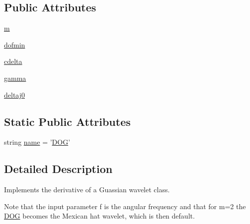 \subsection*{Public Attributes}
\begin{DoxyCompactItemize}
\item 
\hyperlink{classprojects_1_1piwavelet_1_1piwavelet_1_1piwavelet_1_1DOG_ab3b0e7f992bc07e670e7fcd28e2be7ce}{m}
\item 
\hyperlink{classprojects_1_1piwavelet_1_1piwavelet_1_1piwavelet_1_1DOG_ac7d4416da41dd2c65cc37780b350b6aa}{dofmin}
\item 
\hyperlink{classprojects_1_1piwavelet_1_1piwavelet_1_1piwavelet_1_1DOG_aa0750e81cda65734c763621f702e3188}{cdelta}
\item 
\hyperlink{classprojects_1_1piwavelet_1_1piwavelet_1_1piwavelet_1_1DOG_a9ccf6eccd2c0c03b61cb06869472fb35}{gamma}
\item 
\hyperlink{classprojects_1_1piwavelet_1_1piwavelet_1_1piwavelet_1_1DOG_ab3537187ce5b6f2f0fa7fe6a12fe084a}{deltaj0}
\end{DoxyCompactItemize}
\subsection*{Static Public Attributes}
\begin{DoxyCompactItemize}
\item 
string \hyperlink{classprojects_1_1piwavelet_1_1piwavelet_1_1piwavelet_1_1DOG_a54681196aab116d55dc5a4eb1a521d39}{name} = '\hyperlink{classprojects_1_1piwavelet_1_1piwavelet_1_1piwavelet_1_1DOG}{D\-O\-G}'
\end{DoxyCompactItemize}


\subsection{Detailed Description}
Implements the derivative of a Guassian wavelet class. 

Note that the input parameter f is the angular frequency and that for m=2 the \hyperlink{classprojects_1_1piwavelet_1_1piwavelet_1_1piwavelet_1_1DOG}{D\-O\-G} becomes the Mexican hat wavelet, which is then default. 

